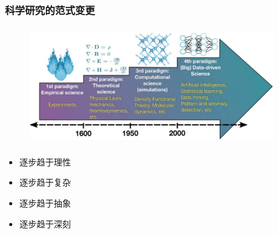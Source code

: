 \small
\frame
{
	\frametitle{科学研究的范式变更}
\begin{figure}[h!]
\vspace*{-0.28in}
\centering
\includegraphics[height=2.00in,width=4.15in]{Figures/Four_Model_3.png}
\label{Four_Model}
\end{figure}
\begin{minipage}[b]{0.48\textwidth}
 {\fontsize{7.5pt}{6.0pt}\selectfont\begin{itemize}%
	 \setlength{\itemsep}{10pt}
 \item 逐步趋于理性
 \item 逐步趋于复杂
 \end{itemize}}
\end{minipage}
\hfill
\begin{minipage}[b]{0.48\textwidth}
 {\fontsize{7.5pt}{6.0pt}\selectfont\begin{itemize}%
	 \setlength{\itemsep}{10pt}
 \item 逐步趋于抽象
 \item 逐步趋于深刻
 \end{itemize}}
\end{minipage}
}

